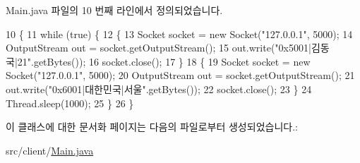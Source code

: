 Main.\-java 파일의 10 번째 라인에서 정의되었습니다.


\begin{DoxyCode}
10                                                                                                           \{
11         \textcolor{keywordflow}{while} (\textcolor{keyword}{true}) \{
12             \{
13                 Socket socket = \textcolor{keyword}{new} Socket(\textcolor{stringliteral}{"127.0.0.1"}, 5000);
14                 OutputStream out = socket.getOutputStream();
15                 out.write(\textcolor{stringliteral}{"0x5001|김동국|21"}.getBytes());
16                 socket.close();
17             \}
18             \{
19                 Socket socket = \textcolor{keyword}{new} Socket(\textcolor{stringliteral}{"127.0.0.1"}, 5000);
20                 OutputStream out = socket.getOutputStream();
21                 out.write(\textcolor{stringliteral}{"0x6001|대한민국|서울"}.getBytes());
22                 socket.close();
23             \}
24             Thread.sleep(1000);
25         \}
26     \}
\end{DoxyCode}


이 클래스에 대한 문서화 페이지는 다음의 파일로부터 생성되었습니다.\-:\begin{DoxyCompactItemize}
\item 
src/client/\hyperlink{_main_8java}{Main.\-java}\end{DoxyCompactItemize}
